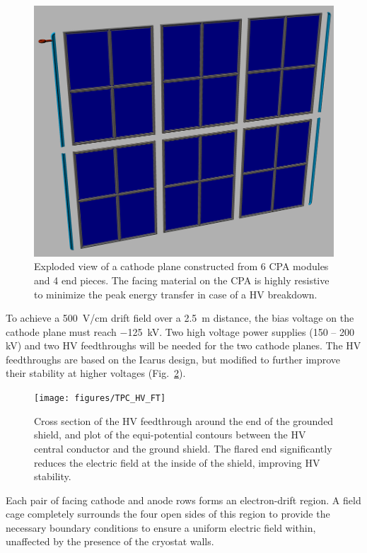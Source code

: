 \begin{figure}[t]
\centering
\includegraphics[width=5in]{figures/TPC_CPA_1}
\caption{Exploded view of a cathode plane constructed from 6 CPA modules and 4 end pieces. The facing material on the CPA is highly resistive to minimize the peak energy transfer in case of a HV breakdown.}
\label{fig:tpc_cpa_1}
\end{figure}

To achieve a 500~V/cm drift field over a 2.5~m distance, the bias 
voltage on the cathode plane must reach $-$125~kV. Two high voltage power supplies (150 -- 200 kV) and two HV feedthroughs will be needed for the two cathode planes.  The HV feedthroughs are based on the Icarus design, but modified to further improve their stability at higher voltages (Fig.~\ref{fig:tpc_hv_ft}).

\begin{figure}[hb]
\centering
\texttt{[image: figures/TPC\_HV\_FT]}
\caption{Cross section of the HV feedthrough around the end of the grounded shield, and plot of the equi-potential contours between the HV central conductor and the ground shield. The flared end significantly reduces the electric field at the inside of the shield, improving HV stability.}
\label{fig:tpc_hv_ft}
\end{figure}



Each pair of facing cathode and anode rows forms an electron-drift region. 
A field cage  completely surrounds the four open sides of this region
to provide the necessary boundary conditions to ensure a uniform electric field within, unaffected by the presence of the cryostat walls.

